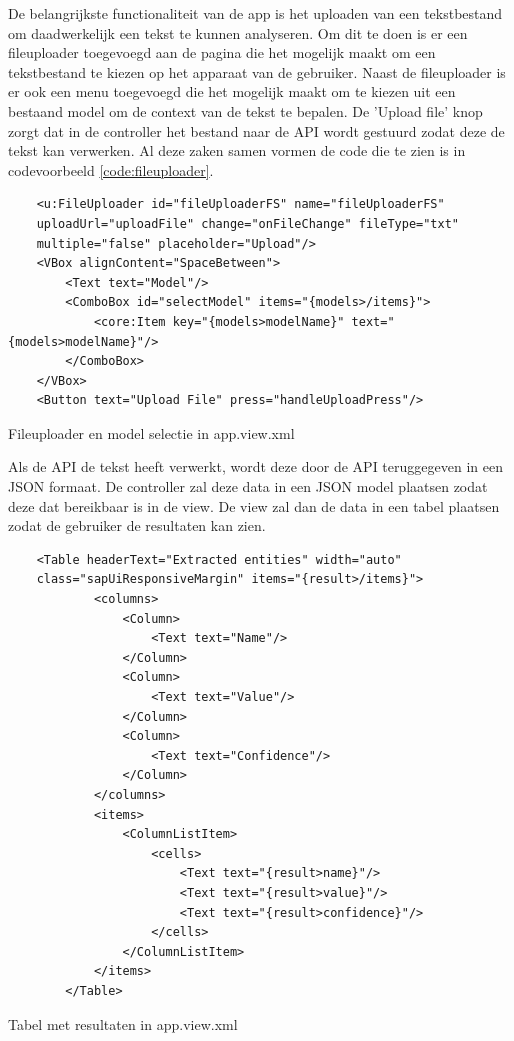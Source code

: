 De belangrijkste functionaliteit van de app is het uploaden van een tekstbestand om daadwerkelijk een tekst te kunnen analyseren. Om dit te doen is er een fileuploader toegevoegd aan de pagina die het mogelijk maakt om een tekstbestand te kiezen op het apparaat van de gebruiker. Naast de fileuploader is er ook een menu toegevoegd die het mogelijk maakt om te kiezen uit een bestaand model om de context van de tekst te bepalen. De 'Upload file' knop zorgt dat in de controller het bestand naar de API wordt gestuurd zodat deze de tekst kan verwerken. Al deze zaken samen vormen de code die te zien is in codevoorbeeld \ref{code:fileuploader}.
\begin{listing}[H]
\begin{verbatim}
    <u:FileUploader id="fileUploaderFS" name="fileUploaderFS" 
    uploadUrl="uploadFile" change="onFileChange" fileType="txt" 
    multiple="false" placeholder="Upload"/>
    <VBox alignContent="SpaceBetween">
        <Text text="Model"/>
        <ComboBox id="selectModel" items="{models>/items}">
            <core:Item key="{models>modelName}" text="{models>modelName}"/>
        </ComboBox>
    </VBox>
    <Button text="Upload File" press="handleUploadPress"/>
\end{verbatim}
\caption{Fileuploader en model selectie in app.view.xml}
\label{code:fileuploader}
\end{listing}

Als de API de tekst heeft verwerkt, wordt deze door de API teruggegeven in een JSON formaat. De controller zal deze data in een JSON model plaatsen zodat deze dat bereikbaar is in de view. De view zal dan de data in een tabel plaatsen zodat de gebruiker de resultaten kan zien.

\begin{listing}[H]
\begin{verbatim}
    <Table headerText="Extracted entities" width="auto" 
    class="sapUiResponsiveMargin" items="{result>/items}">
            <columns>
                <Column>
                    <Text text="Name"/>
                </Column>
                <Column>
                    <Text text="Value"/>
                </Column>
                <Column>
                    <Text text="Confidence"/>
                </Column>
            </columns>
            <items>
                <ColumnListItem>
                    <cells>
                        <Text text="{result>name}"/>
                        <Text text="{result>value}"/>
                        <Text text="{result>confidence}"/>
                    </cells>
                </ColumnListItem>
            </items>
        </Table>
\end{verbatim}
\caption{Tabel met resultaten in app.view.xml}
\end{listing}

